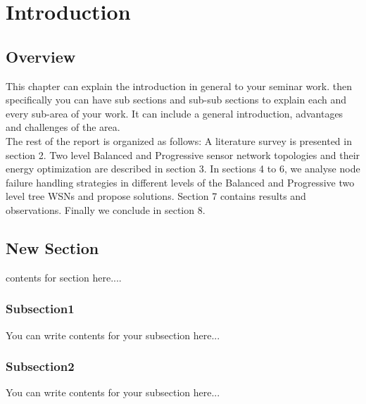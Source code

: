 \chapter{Introduction}


\ifpdf
    \graphicspath{{Introduction/IntroductionFigs/PNG/}{Introduction/IntroductionFigs/PDF/}{Introduction/IntroductionFigs/}}
\else
  \graphicspath{{Introduction/IntroductionFigs/EPS/}{Introduction/IntroductionFigs/}}
\fi

\section{Overview}

This chapter can explain the introduction in general to your seminar work. then specifically you can have sub sections and sub-sub sections to explain each and every sub-area of your work. It can include a general introduction, advantages and challenges of the area.\\[1ex]

The rest of the report is organized as follows: A literature survey is presented in section 2. Two level Balanced and Progressive sensor network topologies and their energy optimization are described in section 3. In sections 4 to 6, we analyse node failure handling strategies in different levels of the Balanced and Progressive two level tree WSNs and propose solutions. Section 7 contains results and observations. Finally we conclude in section 8. \\[1ex]

\section{New Section}
contents for section here....
\subsection{Subsection1}
You can write contents for your subsection here...

\subsection{Subsection2}

You can write contents for your subsection here...



